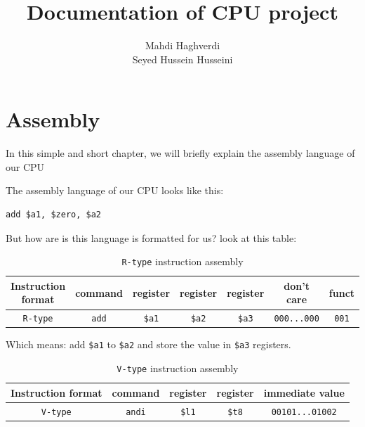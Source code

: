 \documentclass[12pt, dvipsnames, svgnames, x11names, oneside]{book}
\title{Documentation of CPU project}
\author{
Mahdi Haghverdi \\
Seyed Hussein Husseini \\
}
\newenvironment{sansserif}{\sffamily}{\normalfont}
\begin{document}
\maketitle
\frontmatter
\tableofcontents
\mainmatter

\chapter{Assembly}
\begin{sansserif}
	In this simple and short chapter, we will briefly explain the assembly language of our CPU
\end{sansserif}

The assembly language of our CPU looks like this:

\begin{lstlisting}
add $a1, $zero, $a2	
\end{lstlisting}

But how are is this language is formatted for us?
look at this table:

\begin{table}[H]
\begin{adjustbox}{width=\textwidth}
\begin{tabular}{|c|c|c|c|c|c|c|}
\hline
Instruction format & command & register & register & register & don't care & funct \\
\hline
\texttt{R-type} & \texttt{add} & \texttt{\$a1} & \texttt{\$a2} & \texttt{\$a3} & \texttt{000...000} & \texttt{001}\\
\hline
\end{tabular}
\end{adjustbox}
\caption{\texttt{R-type} instruction assembly}
\end{table}

Which means: add \texttt{\$a1} to \texttt{\$a2} and store the value in \texttt{\$a3} registers.

\begin{table}[H]
\begin{adjustbox}{width=\textwidth}
\begin{tabular}{|c|c|c|c|c|}
\hline
Instruction format & command & register & register & immediate value \\
\hline
\hline
\texttt{V-type} & \texttt{andi} & \texttt{\$l1} & \texttt{\$t8} & \texttt{00101...01002} \\
\hline
\end{tabular}
\end{adjustbox}
\caption{\texttt{V-type} instruction assembly}
\end{table}
\end{document}
